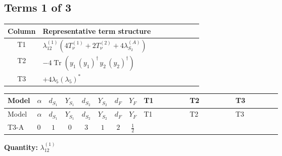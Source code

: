 \documentclass[8pt]{article}
\begin{document}
\begin{landscape}
\subsection*{Terms 1 of 3}
\begin{center}
\begin{tabular}{@{}c >{\raggedright\arraybackslash}p{0.82\linewidth}@{}}
\toprule
Column & Representative term structure \\
\midrule
T1 & \(\displaystyle {\lambda_{12}^{(1)}} (4 T_{\nu}^{(1)}+2 T_{\nu}^{(2)}+4 {\lambda_{S_2}^{(A)}})\) \\
\midrule
T2 & \(\displaystyle -4 \operatorname{Tr}\!\left({y_1}\,\left({y_1}\right)^{\dagger}\,{y_2}\,\left({y_2}\right)^{\dagger}\right)\) \\
\midrule
T3 & \(\displaystyle +4 {\lambda_5} \left({\lambda_5}\right)^{*}\) \\
\midrule
\bottomrule
\end{tabular}
\end{center}
\smallskip
\tiny
\begin{longtable}{@{}llcccccc >{\raggedright\arraybackslash}p{0.21\linewidth} >{\raggedright\arraybackslash}p{0.21\linewidth} >{\raggedright\arraybackslash}p{0.21\linewidth}@{}}
\toprule
Model & $\alpha$ & $d_{S_1}$ & $Y_{S_1}$ & $d_{S_2}$ & $Y_{S_2}$ & $d_F$ & $Y_F$ & T1 & T2 & T3 \\
\midrule
\endfirsthead
\toprule
Model & $\alpha$ & $d_{S_1}$ & $Y_{S_1}$ & $d_{S_2}$ & $Y_{S_2}$ & $d_F$ & $Y_F$ & T1 & T2 & T3 \\
\midrule
\endhead
T3-A & $0$ & $1$ & $0$ & $3$ & $1$ & $2$ & $\frac{1}{2}$ & \scriptsize\adjustbox{max width=\linewidth}{$\begin{gathered} {\lambda_{12}^{(1)}} (4 T_{\nu}^{(1)}+2 T_{\nu}^{(2)}+4 {\lambda_{S_2}^{(A)}})\end{gathered}$} & \scriptsize\adjustbox{max width=\linewidth}{$\begin{gathered} -4 \operatorname{Tr}\!\left({y_1}\,\left({y_1}\right)^{\dagger}\,{y_2}\,\left({y_2}\right)^{\dagger}\right)\end{gathered}$} & \scriptsize\adjustbox{max width=\linewidth}{$\begin{gathered} +4 {\lambda_5} \left({\lambda_5}\right)^{*}\end{gathered}$} \\
\midrule
\bottomrule
\end{longtable}
\clearpage
\noindent\textbf{Quantity: }$\lambda_{12}^{(1)}$\par\smallskip

\end{landscape}
\end{document}
